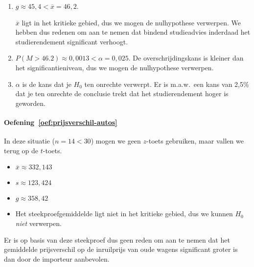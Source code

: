 \begin{enumerate}
  \item $g \approx 45,4 < \overline{x} = 46,2$.
  
  $\overline{x}$ ligt in het kritieke gebied, dus we mogen de nulhypothese verwerpen. We hebben dus redenen om aan te nemen dat bindend studieadvies inderdaad het studierendement significant verhoogt.
  
  \item $P(M > 46.2) \approx 0,0013 < \alpha = 0,025$. De overschrijdingskans is kleiner dan het significantieniveau, dus we mogen de nulhypothese verwerpen.
  
  \item  $\alpha$ is de kans dat je $H_{0}$ ten onrechte verwerpt. Er is m.a.w.~een kans van 2,5\% dat je ten onrechte de conclusie trekt dat het studierendement hoger is geworden.
\end{enumerate}

\paragraph{Oefening~\ref{oef:prijsverschil-autos}}

In deze situatie ($n = 14 < 30$) mogen we geen $z$-toets gebruiken, maar vallen we terug op de $t$-toets.

\begin{itemize}
  \item $\overline{x} \approx 332,143$
  \item $s \approx 123,424$
  \item $g \approx 358,42$
  \item Het steekproefgemiddelde ligt niet in het kritieke gebied, dus we kunnen $H_0$ \emph{niet} verwerpen.
\end{itemize}

Er is op basis van deze steekproef dus geen reden om aan te nemen dat het gemiddelde prijsverschil op de inruilprijs van oude wagens significant groter is dan door de importeur aanbevolen.
